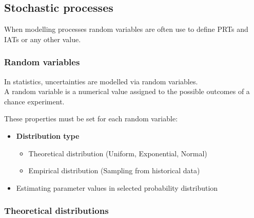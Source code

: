 \subsection{Stochastic processes}

When modelling processes random variables are often use to define PRTs
and IATs or any other value.

\subsubsection{Random variables}

In statistics, uncertainties are modelled via random variables.\\
A random variable is a numerical value assigned to the possible outcomes
of a chance experiment.

These properties must be set for each random variable:

\begin{itemize}
	\tightlist
	\item \textbf{Distribution type}
	\begin{itemize}
		\tightlist
		\item Theoretical distribution (Uniform, Exponential, Normal)
		\item Empirical distribution (Sampling from historical data)
	\end{itemize}
	\item Estimating parameter values in selected probability distribution
\end{itemize}

\subsubsection{Theoretical distributions}

